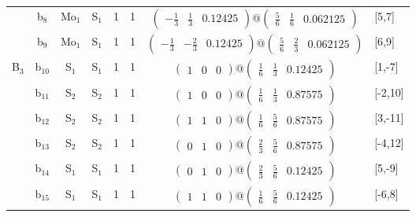 \documentclass[fleqn,10pt,landscape]{article}
\begin{document}
\begin{itemize}
\begin{center}
\begin{longtable}{cc|cc|c|c|c|l}
& b$_{8}$ & Mo$_{1}$ & S$_{1}$ & 1 & 1 & $\begin{pmatrix} - \frac{1}{3} & \frac{1}{3} & 0.12425 \end{pmatrix}@\begin{pmatrix} \frac{5}{6} & \frac{1}{6} & 0.062125 \end{pmatrix}$ & [5,7] \\
& b$_{9}$ & Mo$_{1}$ & S$_{1}$ & 1 & 1 & $\begin{pmatrix} - \frac{1}{3} & - \frac{2}{3} & 0.12425 \end{pmatrix}@\begin{pmatrix} \frac{5}{6} & \frac{2}{3} & 0.062125 \end{pmatrix}$ & [6,9] \\ \hline
B$_{3}$ & b$_{10}$ & S$_{1}$ & S$_{1}$ & 1 & 1 & $\begin{pmatrix} 1 & 0 & 0 \end{pmatrix}@\begin{pmatrix} \frac{1}{6} & \frac{1}{3} & 0.12425 \end{pmatrix}$ & [1,-7] \\
& b$_{11}$ & S$_{2}$ & S$_{2}$ & 1 & 1 & $\begin{pmatrix} 1 & 0 & 0 \end{pmatrix}@\begin{pmatrix} \frac{1}{6} & \frac{1}{3} & 0.87575 \end{pmatrix}$ & [-2,10] \\
& b$_{12}$ & S$_{2}$ & S$_{2}$ & 1 & 1 & $\begin{pmatrix} 1 & 1 & 0 \end{pmatrix}@\begin{pmatrix} \frac{1}{6} & \frac{5}{6} & 0.87575 \end{pmatrix}$ & [3,-11] \\
& b$_{13}$ & S$_{2}$ & S$_{2}$ & 1 & 1 & $\begin{pmatrix} 0 & 1 & 0 \end{pmatrix}@\begin{pmatrix} \frac{2}{3} & \frac{5}{6} & 0.87575 \end{pmatrix}$ & [-4,12] \\
& b$_{14}$ & S$_{1}$ & S$_{1}$ & 1 & 1 & $\begin{pmatrix} 0 & 1 & 0 \end{pmatrix}@\begin{pmatrix} \frac{2}{3} & \frac{5}{6} & 0.12425 \end{pmatrix}$ & [5,-9] \\
& b$_{15}$ & S$_{1}$ & S$_{1}$ & 1 & 1 & $\begin{pmatrix} 1 & 1 & 0 \end{pmatrix}@\begin{pmatrix} \frac{1}{6} & \frac{5}{6} & 0.12425 \end{pmatrix}$ & [-6,8] \\
\end{longtable}
\end{center}


\end{itemize}
\end{document}
